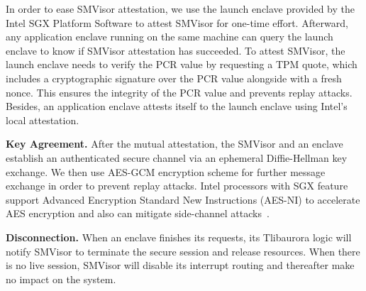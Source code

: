In order to ease SMVisor attestation, we use the launch enclave provided by the Intel SGX Platform Software to attest SMVisor for one-time effort. Afterward, any application enclave running on the same machine can query the launch enclave to know if SMVisor attestation has succeeded. To attest  SMVisor, the launch enclave needs to verify the PCR value by requesting a TPM quote, which includes a cryptographic signature over the PCR value alongside with a fresh nonce. This ensures the integrity of the PCR value and prevents replay attacks. Besides, an application enclave attests itself to the launch enclave using Intel's local attestation.

\textbf{Key Agreement.}
After the mutual attestation, the SMVisor and an enclave establish an authenticated secure channel via an ephemeral Diffie-Hellman key exchange. We then use AES-GCM encryption scheme for further message exchange in order to prevent replay attacks. Intel processors with SGX feature support Advanced Encryption Standard New Instructions (AES-NI) to accelerate AES encryption and also can mitigate side-channel attacks~\cite{Corporation2016Intel}.



\textbf{Disconnection.}
When an enclave finishes its requests, its Tlibaurora logic will notify SMVisor to terminate the secure session and release resources. When there is no live session, SMVisor will disable its interrupt routing and thereafter make no impact on the system.

